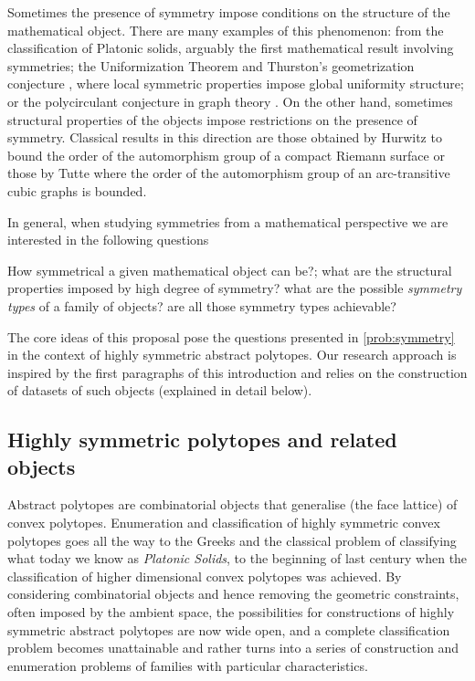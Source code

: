 \documentclass[a4paper,12pt,english]{article}
\begin{document}
Sometimes the presence of symmetry impose conditions on the structure of the mathematical object. 
There are many examples of this phenomenon: from the classification of Platonic solids, arguably the first mathematical result involving symmetries; the Uniformization Theorem \cite{Abikoff1981_UniformizationTheorem} and Thurston's geometrization conjecture \cite{Thurston1982_ThreeDimensionalManifolds}, where local symmetric properties impose global uniformity structure;  or the polycirculant conjecture in graph theory \cite{Marusic1981_VertexSymmetricDigraphs}. 
On the other hand, sometimes structural properties of the objects impose restrictions on the presence of symmetry. Classical results in this direction are those obtained by Hurwitz \cite{Hurwitz1892_UeberAlgebraischeGebilde} to bound the order of the automorphism group of a compact Riemann surface or those by Tutte \cite{Tutte1959_SymmetryCubicGraphs} where the order of the automorphism group of an arc-transitive cubic graphs is bounded.

In general, when studying symmetries from a mathematical perspective we are interested in the following questions

\begin{problem}\label{prob:symmetry}
  How symmetrical a given mathematical object can be?; what are the  structural properties imposed by high degree of symmetry? what are the possible \emph{symmetry types} of a family of objects? are all those symmetry types achievable?
\end{problem}

The core ideas of this proposal pose the questions presented in \cref{prob:symmetry} in the context of highly symmetric abstract polytopes. Our research approach is inspired by the first paragraphs of this introduction and relies on the construction of datasets of such objects (explained in detail below).

\subsection*{Highly symmetric polytopes and related objects}

Abstract polytopes are combinatorial objects that generalise (the face lattice) of convex polytopes.
Enumeration and classification of highly symmetric convex polytopes goes all the way to the Greeks and the classical problem of classifying what today we know as \emph{Platonic Solids}, to the beginning of last century when the classification of higher dimensional convex polytopes was achieved.
By considering combinatorial objects and hence removing the geometric constraints, often imposed by the ambient space, the possibilities for constructions of highly symmetric abstract polytopes are now wide open, and a complete classification problem becomes unattainable and rather turns into a series of construction and enumeration problems of families with particular characteristics.
\end{document}

